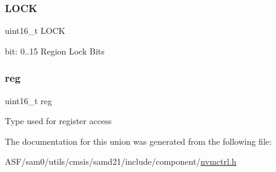 \subsubsection{\texorpdfstring{LOCK}{LOCK}}
{\footnotesize\ttfamily uint16\+\_\+t L\+O\+CK}

bit\+: 0..15 Region Lock Bits \mbox{\label{union_n_v_m_c_t_r_l___l_o_c_k___type_a11760f5020019f4aa8cb02e694f7cc44}} 
\subsubsection{\texorpdfstring{reg}{reg}}
{\footnotesize\ttfamily uint16\+\_\+t reg}

Type used for register access 

The documentation for this union was generated from the following file\+:\begin{DoxyCompactItemize}
\item 
A\+S\+F/sam0/utils/cmsis/samd21/include/component/\mbox{\hyperlink{component_2nvmctrl_8h}{nvmctrl.\+h}}\end{DoxyCompactItemize}
